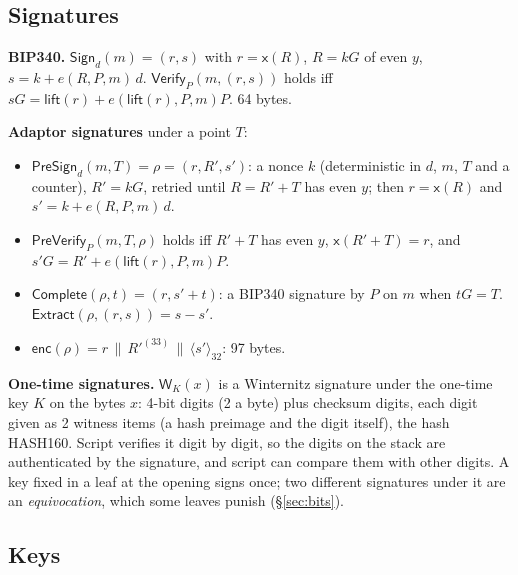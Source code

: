 \documentclass[11pt]{article}
\theoremstyle{plain}
\theoremstyle{definition}
\newcommand{\be}[2]{\langle #1\rangle_{#2}}
\newcommand{\xo}[1]{\mathsf{x}(#1)}
\newcommand{\Sign}{\mathsf{Sign}}
\newcommand{\Vfy}{\mathsf{Verify}}
\newcommand{\PSign}{\mathsf{PreSign}}
\newcommand{\PVfy}{\mathsf{PreVerify}}
\newcommand{\Compl}{\mathsf{Complete}}
\newcommand{\Extr}{\mathsf{Extract}}
\newcommand{\Wots}{\mathsf{W}}
\newcommand{\enc}{\mathsf{enc}}
\begin{document}
\subsection{Signatures}

\textbf{BIP340.} $\Sign_d(m) = (r, s)$ with $r = \xo{R}$, $R = kG$ of
even $y$, $s = k + e(R, P, m)\,d$. $\Vfy_P(m, (r, s))$ holds iff $sG =
\mathsf{lift}(r) + e(\mathsf{lift}(r), P, m)P$. 64 bytes.

\textbf{Adaptor signatures} under a point $T$:
\begin{itemize}[nosep]
\item $\PSign_d(m, T) = \rho = (r, R', s')$: a nonce $k$ (deterministic
  in $d$, $m$, $T$ and a counter), $R' = kG$, retried until $R = R' + T$
  has even $y$; then $r = \xo{R}$ and $s' = k + e(R, P, m)\,d$.
\item $\PVfy_P(m, T, \rho)$ holds iff $R' + T$ has even $y$, $\xo{R' +
  T} = r$, and $s'G = R' + e(\mathsf{lift}(r), P, m)P$.
\item $\Compl(\rho, t) = (r, s' + t)$: a BIP340 signature by $P$ on $m$
  when $tG = T$. $\Extr(\rho, (r, s)) = s - s'$.
\item $\enc(\rho) = r \,\|\, R'^{(33)} \,\|\, \be{s'}{32}$: 97 bytes.
\end{itemize}

\textbf{One-time signatures.} $\Wots_K(x)$ is a Winternitz signature
under the one-time key $K$ on the bytes $x$: 4-bit digits (2 a byte)
plus checksum digits, each digit given as 2 witness items (a hash
preimage and the digit itself), the hash HASH160. Script verifies it
digit by digit, so the digits on the stack are authenticated by the
signature, and script can compare them with other digits. A key fixed
in a leaf at the opening signs once; two different signatures under it
are an \emph{equivocation}, which some leaves punish
(\S\ref{sec:bits}).

\subsection{Keys}
\end{document}
